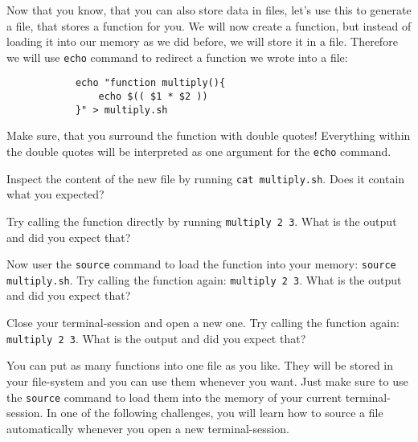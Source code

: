 \begin{challenge}
    \begin{task}
        Now that you know, that you can also store data in files, let's use this to generate a file, that stores a function for you.
        We will now create a function, but instead of loading it into our memory as we did before, we will store it in a file.
        Therefore we will use \texttt{echo} command to redirect a function we wrote into a file:
        \begin{lstlisting}
            echo "function multiply(){
                echo $(( $1 * $2 ))
            }" > multiply.sh
        \end{lstlisting}
        Make sure, that you surround the function with double quotes! 
        Everything within the double quotes will be interpreted as one argument for the \texttt{echo} command.
        \begin{questions}
            \item Inspect the content of the new file by running \texttt{cat multiply.sh}. Does it contain what you expected?
            \item Try calling the function directly by running \texttt{multiply 2 3}. What is the output and did you expect that?
            \item Now user the \texttt{source} command to load the function into your memory: \texttt{source multiply.sh}. Try calling the function again: \texttt{multiply 2 3}. What is the output and did you expect that?
            \item Close your terminal-session and open a new one. Try calling the function again: \texttt{multiply 2 3}. What is the output and did you expect that?
        \end{questions}
    \end{task}


    \begin{advice}
        You can put as many functions into one file as you like. 
        They will be stored in your file-system and you can use them whenever you want. 
        Just make sure to use the \texttt{source} command to load them into the memory of your current terminal-session.
        In one of the following challenges, you will learn how to source a file automatically whenever you open a new terminal-session.
    \end{advice}
\end{challenge}
